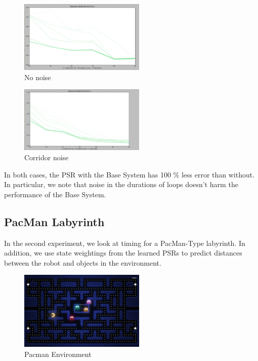 \documentclass{acm_proc_article-sp}
\begin{document}
\begin{figure}[ht!]
\centering
\includegraphics[width=60mm]{lucasplots/doubleloop0.png}
\caption{No noise \label{overflow}}
\end{figure}


\begin{figure}[ht!]
\centering
\includegraphics[width=60mm]{lucasplots/doubleloop0_1.png}
\caption{Corridor noise \label{overflow}}
\end{figure}

In both cases, the PSR with the Base System has 100 \% less error than without. In particular, we note that noise in the durations of loops doesn't harm the performance of the Base System.

\subsection{PacMan Labyrinth}

In the second experiment, we look at timing for a PacMan-Type labyrinth. In addition, we use state weightings from the learned PSRs to predict distances between the robot and objects in the environment. 

\begin{figure}[ht!]
\centering
\includegraphics[width=60mm]{lucasplots/pac-man.jpg}
\caption{Pacman Environment \label{overflow}}
\end{figure}
\end{document}
